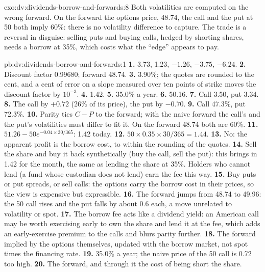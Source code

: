 \begin{solution}{exo:dv:dividends-borrow-and-forwards:8}
Both volatilities are computed on the wrong forward. On the forward the options price,
48.74, the call and the put at 50 both imply 60\%: there is no volatility difference to
capture. The trade is a reversal in disguise: selling puts and buying calls, hedged by
shorting shares, needs a borrow at 35\%, which costs what the ``edge'' appears to pay.
\end{solution}

\begin{solution}{pb:dv:dividends-borrow-and-forwards:1}
\textbf{1.} 3.73, 1.23, $-1.26$, $-3.75$, $-6.24$.
\textbf{2.} Discount factor 0.99680; forward 48.74.
\textbf{3.} 3.90\%; the quotes are rounded to the cent, and a cent of error on a slope
measured over ten points of strike moves the discount factor by $10^{-3}$.
\textbf{4.} 1.42.
\textbf{5.} 35.0\% a year.
\textbf{6.} 50.16.
\textbf{7.} Call 3.50, put 3.34.
\textbf{8.} The call by $+0.72$ (26\% of its price), the put by $-0.70$.
\textbf{9.} Call 47.3\%, put 72.3\%.
\textbf{10.} Parity ties $C-P$ to the forward; with the naive forward the call's and the
put's volatilities must differ to fit it. On the forward 48.74 both are 60\%.
\textbf{11.} $51.26-50e^{-0.04\times30/365}$: 1.42 today.
\textbf{12.} $50\times0.35\times30/365=1.44$.
\textbf{13.} No: the apparent profit is the borrow cost, to within the rounding of the quotes.
\textbf{14.} Sell the share and buy it back synthetically (buy the call, sell the put):
this brings in 1.42 for the month, the same as lending the share at 35\%. Holders who
cannot lend (a fund whose custodian does not lend) earn the fee this way.
\textbf{15.} Buy puts or put spreads, or sell calls: the options carry the borrow cost in
their prices, so the view is expensive but expressible.
\textbf{16.} The forward jumps from 48.74 to 49.96: the 50 call rises and the put falls by
about 0.6 each, a move unrelated to volatility or spot.
\textbf{17.} The borrow fee acts like a dividend yield: an American call may be worth
exercising early to own the share and lend it at the fee, which adds an early-exercise
premium to the calls and blurs parity further.
\textbf{18.} The forward implied by the options themselves, updated with the borrow market,
not spot times the financing rate.
\textbf{19.} 35.0\% a year; the naive price of the 50 call is 0.72 too high.
\textbf{20.} The forward, and through it the cost of being short the share.
\end{solution}

